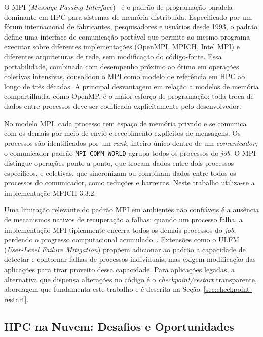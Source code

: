 O MPI (\textit{Message Passing Interface})~\cite{mpi2009spec} é o padrão de
programação paralela dominante em HPC para sistemas de memória distribuída.
Especificado por um fórum internacional de fabricantes, pesquisadores e usuários
desde 1993, o padrão define uma interface de comunicação portável que permite ao
mesmo programa executar sobre diferentes implementações (OpenMPI, MPICH, Intel MPI)
e diferentes arquiteturas de rede, sem modificação do código-fonte. Essa
portabilidade, combinada com desempenho próximo ao ótimo em operações coletivas
intensivas, consolidou o MPI como modelo de referência em HPC ao longo de três
décadas. A principal desvantagem em relação a modelos de memória compartilhada,
como OpenMP, é o maior esforço de programação: toda troca de dados entre processos
deve ser codificada explicitamente pelo desenvolvedor.

No modelo MPI, cada processo tem espaço de memória privado e se comunica com os
demais por meio de envio e recebimento explícitos de mensagens. Os processos são
identificados por um \textit{rank}, inteiro único dentro de um \textit{comunicador};
o comunicador padrão \texttt{MPI\_COMM\_WORLD} agrupa todos os processos do
\textit{job}. O MPI distingue operações ponto-a-ponto, que trocam dados entre dois
processos específicos, e coletivas, que sincronizam ou combinam dados entre todos os
processos do comunicador, como reduções e barreiras. Neste trabalho utiliza-se a
implementação MPICH 3.3.2.

Uma limitação relevante do padrão MPI em ambientes não confiáveis é a ausência de
mecanismos nativos de recuperação a falhas: quando um processo falha, a implementação
MPI tipicamente encerra todos os demais processos do \textit{job}, perdendo o progresso
computacional acumulado~\cite{bland2013ulfm}. Extensões como o ULFM
(\textit{User-Level Failure Mitigation}) propõem adicionar ao padrão a capacidade de
detectar e contornar falhas de processos individuais, mas exigem modificação das
aplicações para tirar proveito dessa capacidade. Para aplicações legadas, a alternativa
que dispensa alterações no código é o \textit{checkpoint/restart} transparente,
abordagem que fundamenta este trabalho e é descrita na
Seção~\ref{sec:checkpoint-restart}.

\subsection{HPC na Nuvem: Desafios e Oportunidades}
\label{sec:hpc-nuvem}

